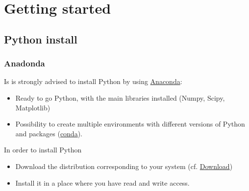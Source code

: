 \section{Getting started}

\subsection{Python install}

\begin{frame}[fragile]
\frametitle{Anadonda}

Is is strongly advised to install Python by using \href{https://www.anaconda.com/}{Anaconda}:
\begin{itemize}
    \item Ready to go Python, with the main libraries installed (Numpy, Scipy, Matplotlib)
    \item Possibility to create multiple environments with different versions of Python and packages (\href{https://conda.io/en/latest/}{conda}).
\end{itemize}

\vspace{1em}
In order to install Python
\begin{itemize}
    \item{Download the distribution corresponding to your system (cf. \href{https://www.anaconda.com/distribution/#download-section}{Download})}
    \item Install it in a place where you have read and write access.
\end{itemize}
\end{frame}

